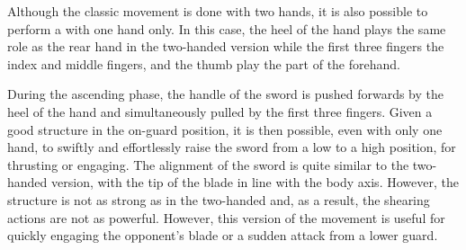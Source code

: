 Although the classic movement is done with two hands, it is also possible to perform a \Duo{} with one hand only. In this case, the heel of the hand plays the same role as the rear hand in the two-handed version while the first three fingers \textemdash{} the index and middle fingers, and the thumb \textemdash{} play the part of the forehand. 

During the ascending phase, the handle of the sword is pushed forwards by the heel of the hand and simultaneously pulled by the first three fingers. Given a good structure in the on-guard position, it is then possible, even with only one hand, to swiftly and effortlessly raise the sword from a low to a high position, for thrusting or engaging.  
The alignment of the sword is quite similar to the two-handed version, with the tip of the blade in line with the body axis. However, the structure is not as strong as in the two-handed \Duo{} and, as a result, the shearing actions are not as powerful. However, this version of the movement is useful for quickly engaging the opponent's blade or a sudden attack from a lower guard. 


